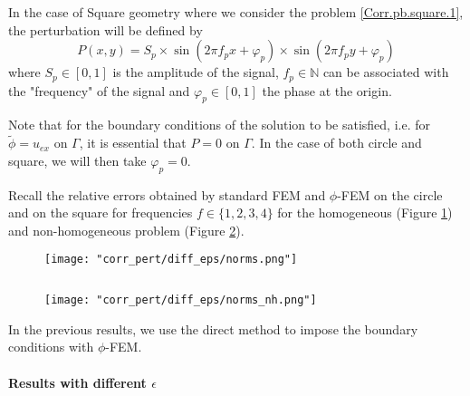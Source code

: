 In the case of Square geometry where we consider the problem \ref{Corr.pb.square.1}, the perturbation will be defined by
\begin{equation*}
	P(x,y)=S_p\times\sin\left(2\pi f_px+\varphi_p\right)\times\sin\left(2\pi f_py+\varphi_p\right)
\end{equation*}
where $S_p\in[0,1]$ is the amplitude of the signal, $f_p\in\mathbb{N}$ can be associated with the "frequency" of the signal and $\varphi_p\in[0,1]$ the phase at the origin.

\begin{Rem}
	Note that for the boundary conditions of the solution to be satisfied, i.e. for $\tilde{\phi}=u_{ex}$ on $\Gamma$, it is essential that $P=0$ on $\Gamma$. In the case of both circle and square, we will then take $\varphi_p=0$.
\end{Rem}

Recall the relative errors obtained by standard FEM and $\phi$-FEM on the circle and on the square for frequencies $f\in\{1,2,3,4\}$ for the homogeneous  (Figure \ref{norms}) and non-homogeneous problem  (Figure \ref{norms_nh}).

\begin{minipage}{0.48\linewidth}
	\begin{figure}[H]
		\centering
		\texttt{[image: "corr\_pert/diff\_eps/norms.png"]}
		\label{norms}
	\end{figure} 
\end{minipage} $\qquad$
\begin{minipage}{0.48\linewidth}
	\begin{figure}[H]
		\centering
		\texttt{[image: "corr\_pert/diff\_eps/norms\_nh.png"]}
		\label{norms_nh}
	\end{figure} 
\end{minipage}

\begin{Rem}
	In the previous results, we use the direct method to impose the boundary conditions with $\phi$-FEM.
\end{Rem}

\paragraph{Results with different $\epsilon$} \label{Corr.results.disturbed.eps} 

